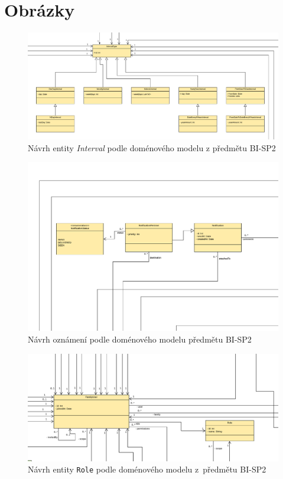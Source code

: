 \chapter{Obrázky}\label{dodatek:images}
    \begin{figure}\centering
        \includegraphics[angle=90, height=0.9\textheight]{pdfs/Interval1}
        \caption[Předešlý návrh entity \texttt{Interval}]{Návrh entity \textit{Interval} podle doménového modelu z předmětu BI-SP2}\label{image:Interval1}
    \end{figure}
    \begin{figure}\centering
            \includegraphics[angle=90, height=0.9\textheight]{pdfs/Notification1}
            \caption[Předešlý návrh oznámení]{Návrh oznámení podle doménového modelu předmětu BI-SP2}\label{image:notification1}
        \end{figure}
        \begin{figure}\centering
	        \includegraphics[angle=90, height=0.9\textheight]{pdfs/Role1}
	        \caption[Návrh \texttt{Role}]{Návrh entity \texttt{Role} podle doménového modelu z~předmětu BI-SP2}\label{image:Role1}
        \end{figure}
